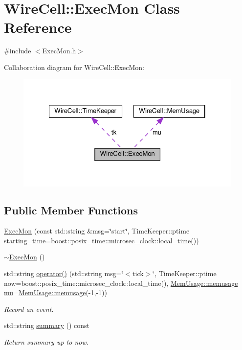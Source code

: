 \hypertarget{class_wire_cell_1_1_exec_mon}{}\section{Wire\+Cell\+:\+:Exec\+Mon Class Reference}
\label{class_wire_cell_1_1_exec_mon}


{\ttfamily \#include $<$Exec\+Mon.\+h$>$}



Collaboration diagram for Wire\+Cell\+:\+:Exec\+Mon\+:
\nopagebreak
\begin{figure}[H]
\begin{center}
\leavevmode
\includegraphics[width=322pt]{class_wire_cell_1_1_exec_mon__coll__graph}
\end{center}
\end{figure}
\subsection*{Public Member Functions}
\begin{DoxyCompactItemize}
\item 
\hyperlink{class_wire_cell_1_1_exec_mon_a1a08950f85d1874aa41ac1231d6e30ca}{Exec\+Mon} (const std\+::string \&msg=\char`\"{}start\char`\"{}, Time\+Keeper\+::ptime starting\+\_\+time=boost\+::posix\+\_\+time\+::microsec\+\_\+clock\+::local\+\_\+time())
\item 
\hyperlink{class_wire_cell_1_1_exec_mon_a0a76667527008a5eabb5901af4c88521}{$\sim$\+Exec\+Mon} ()
\item 
std\+::string \hyperlink{class_wire_cell_1_1_exec_mon_a5c5ea20b413d06cf43a844ebdb6f847e}{operator()} (std\+::string msg=\char`\"{}$<$tick$>$\char`\"{}, Time\+Keeper\+::ptime now=boost\+::posix\+\_\+time\+::microsec\+\_\+clock\+::local\+\_\+time(), \hyperlink{class_wire_cell_1_1_mem_usage_ab022bc829c4166d0161f3c91195f062f}{Mem\+Usage\+::memusage} \hyperlink{class_wire_cell_1_1_exec_mon_a7401839fabb43101f59468d9a1b43864}{mu}=\hyperlink{class_wire_cell_1_1_mem_usage_ab022bc829c4166d0161f3c91195f062f}{Mem\+Usage\+::memusage}(-\/1,-\/1))
\begin{DoxyCompactList}\small\item\em Record an event. \end{DoxyCompactList}\item 
std\+::string \hyperlink{class_wire_cell_1_1_exec_mon_ab46d26801f07ff9da1df0fa4c531a97c}{summary} () const
\begin{DoxyCompactList}\small\item\em Return summary up to now. \end{DoxyCompactList}\end{DoxyCompactItemize}
